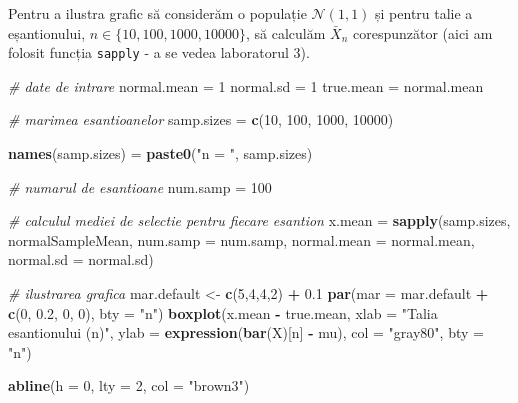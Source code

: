 \documentclass[]{article}
\newenvironment{Shaded}{\begin{snugshade}}{\end{snugshade}}
\newcommand{\KeywordTok}[1]{\textcolor[rgb]{0.13,0.29,0.53}{\textbf{#1}}}
\newcommand{\DataTypeTok}[1]{\textcolor[rgb]{0.13,0.29,0.53}{#1}}
\newcommand{\DecValTok}[1]{\textcolor[rgb]{0.00,0.00,0.81}{#1}}
\newcommand{\FloatTok}[1]{\textcolor[rgb]{0.00,0.00,0.81}{#1}}
\newcommand{\StringTok}[1]{\textcolor[rgb]{0.31,0.60,0.02}{#1}}
\newcommand{\CommentTok}[1]{\textcolor[rgb]{0.56,0.35,0.01}{\textit{#1}}}
\newcommand{\OperatorTok}[1]{\textcolor[rgb]{0.81,0.36,0.00}{\textbf{#1}}}
\newcommand{\NormalTok}[1]{#1}
\begin{document}
Pentru a ilustra grafic să considerăm o populație \(\mathcal{N}(1,1)\)
și pentru talie a eșantionului, \(n\in\{10, 100, 1000, 10000\}\), să
calculăm \(\bar{X}_n\) corespunzător (aici am folosit funcția
\texttt{sapply} - a se vedea laboratorul 3).

\begin{Shaded}
\begin{Highlighting}[]
\CommentTok{# date de intrare}
\NormalTok{normal.mean =}\StringTok{ }\DecValTok{1}
\NormalTok{normal.sd =}\StringTok{ }\DecValTok{1}
\NormalTok{true.mean =}\StringTok{ }\NormalTok{normal.mean}

\CommentTok{# marimea esantioanelor}
\NormalTok{samp.sizes =}\StringTok{ }\KeywordTok{c}\NormalTok{(}\DecValTok{10}\NormalTok{, }\DecValTok{100}\NormalTok{, }\DecValTok{1000}\NormalTok{, }\DecValTok{10000}\NormalTok{)}

\KeywordTok{names}\NormalTok{(samp.sizes) =}\StringTok{ }\KeywordTok{paste0}\NormalTok{(}\StringTok{"n = "}\NormalTok{, samp.sizes)}

\CommentTok{# numarul de esantioane}
\NormalTok{num.samp =}\StringTok{ }\DecValTok{100}

\CommentTok{# calculul mediei de selectie pentru fiecare esantion}
\NormalTok{x.mean =}\StringTok{ }\KeywordTok{sapply}\NormalTok{(samp.sizes, normalSampleMean, }\DataTypeTok{num.samp =}\NormalTok{ num.samp, }
                \DataTypeTok{normal.mean =}\NormalTok{ normal.mean, }\DataTypeTok{normal.sd =}\NormalTok{ normal.sd)}

\CommentTok{# ilustrarea grafica}
\NormalTok{mar.default <-}\StringTok{ }\KeywordTok{c}\NormalTok{(}\DecValTok{5}\NormalTok{,}\DecValTok{4}\NormalTok{,}\DecValTok{4}\NormalTok{,}\DecValTok{2}\NormalTok{) }\OperatorTok{+}\StringTok{ }\FloatTok{0.1}
\KeywordTok{par}\NormalTok{(}\DataTypeTok{mar =}\NormalTok{ mar.default }\OperatorTok{+}\StringTok{ }\KeywordTok{c}\NormalTok{(}\DecValTok{0}\NormalTok{, }\FloatTok{0.2}\NormalTok{, }\DecValTok{0}\NormalTok{, }\DecValTok{0}\NormalTok{), }\DataTypeTok{bty =} \StringTok{"n"}\NormalTok{) }
\KeywordTok{boxplot}\NormalTok{(x.mean }\OperatorTok{-}\StringTok{ }\NormalTok{true.mean, }
        \DataTypeTok{xlab =} \StringTok{"Talia esantionului (n)"}\NormalTok{, }
        \DataTypeTok{ylab =} \KeywordTok{expression}\NormalTok{(}\KeywordTok{bar}\NormalTok{(X)[n] }\OperatorTok{-}\StringTok{ }\NormalTok{mu),}
        \DataTypeTok{col =} \StringTok{"gray80"}\NormalTok{,}
        \DataTypeTok{bty =} \StringTok{"n"}\NormalTok{)}

\KeywordTok{abline}\NormalTok{(}\DataTypeTok{h =} \DecValTok{0}\NormalTok{, }\DataTypeTok{lty =} \DecValTok{2}\NormalTok{, }\DataTypeTok{col =} \StringTok{"brown3"}\NormalTok{)}
\end{Highlighting}
\end{Shaded}
\end{document}
